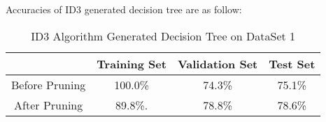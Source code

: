 \documentclass[12pt, letterpaper]{article}
\begin{document}
Accuracies of ID3 generated decision tree are as follow:

\begin{table}[H]
\centering
\caption{ID3 Algorithm Generated Decision Tree on DataSet 1}
\begin{tabular}{cccc}\toprule
    & Training Set & Validation Set & Test Set \\\midrule
Before Pruning & 100.0\% & 74.3\% & 75.1\% \\
After Pruning  & 89.8\%. & 78.8\% & 78.6\%\\\bottomrule
\end{tabular}
\end{table}
\end{document}
